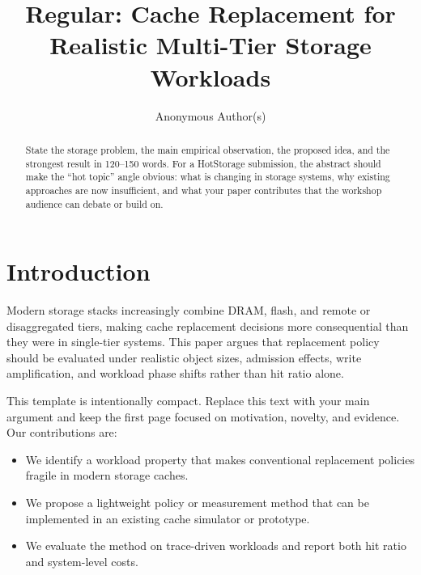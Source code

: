 \documentclass[sigconf,10pt,anonymous,review]{acmart}
\begin{document}
\title{Regular: Cache Replacement for Realistic Multi-Tier Storage Workloads}

\author{Anonymous Author(s)}

\begin{abstract}
State the storage problem, the main empirical observation, the proposed idea,
and the strongest result in 120--150 words. For a HotStorage submission, the
abstract should make the ``hot topic'' angle obvious: what is changing in
storage systems, why existing approaches are now insufficient, and what your
paper contributes that the workshop audience can debate or build on.
\end{abstract}

\maketitle

\section{Introduction}
\label{sec:intro}

Modern storage stacks increasingly combine DRAM, flash, and remote or
disaggregated tiers, making cache replacement decisions more consequential than
they were in single-tier systems. This paper argues that replacement policy
should be evaluated under realistic object sizes, admission effects, write
amplification, and workload phase shifts rather than hit ratio alone.

This template is intentionally compact. Replace this text with your main
argument and keep the first page focused on motivation, novelty, and evidence.
Our contributions are:
\begin{itemize}
  \item We identify a workload property that makes conventional replacement
  policies fragile in modern storage caches.
  \item We propose a lightweight policy or measurement method that can be
  implemented in an existing cache simulator or prototype.
  \item We evaluate the method on trace-driven workloads and report both hit
  ratio and system-level costs.
\end{itemize}
\end{document}
